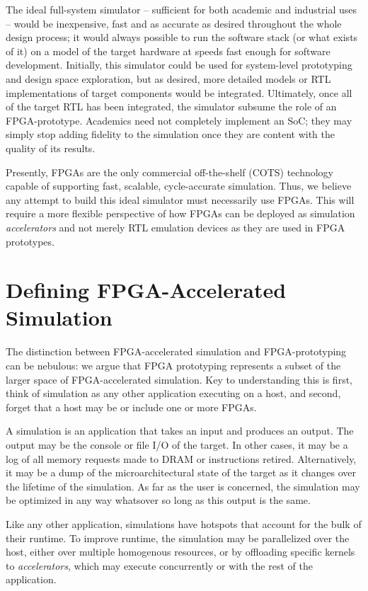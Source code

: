 The ideal full-system simulator -- sufficient for both academic and industrial
uses -- would be inexpensive, fast and as accurate as desired throughout the
whole design process; it would always possible to run the software stack (or
what exists of it) on a model of the target hardware at speeds fast enough for
software development. Initially, this simulator could be used for system-level
prototyping and design space exploration, but as desired, more detailed models
or RTL implementations of target components would be integrated. Ultimately,
once all of the target RTL has been integrated, the simulator subsume the role of an
FPGA-prototype. Academics need not completely implement an SoC; they may simply
stop adding fidelity to the simulation once they are content with the quality
of its results.

Presently, FPGAs are the only commercial off-the-shelf (COTS) technology
capable of supporting fast, scalable, cycle-accurate simulation. Thus, we
believe any attempt to build this ideal simulator must necessarily use FPGAs.
This will require a more flexible perspective of how FPGAs can be deployed as
simulation \emph{accelerators} and not merely RTL emulation devices as they are
used in FPGA prototypes.

\section{Defining FPGA-Accelerated Simulation}

The distinction between FPGA-accelerated simulation and FPGA-prototyping can be
nebulous: we argue that FPGA prototyping represents a subset of the larger
space of FPGA-accelerated simulation. Key to understanding this is first, think of
simulation as any other application executing on a host, and second, forget
that a host may be or include one or more FPGAs.

A simulation is an application that takes an input and produces an output.  The
output may be the console or file I/O of the target. In other cases, it
may be a log of all memory requests made to DRAM or instructions retired.
Alternatively, it may be a dump of the microarchitectural state of the target as it changes over the
lifetime of the simulation.  As far as the user is concerned, the simulation
may be optimized in any way whatsover so long as this output is the same.

Like any other application, simulations have hotspots that account for the bulk
of their runtime. To improve runtime, the simulation may be parallelized over
the host, either over multiple homogenous resources, or by offloading specific
kernels to \emph{accelerators}, which may execute concurrently or with the rest
of the application.

